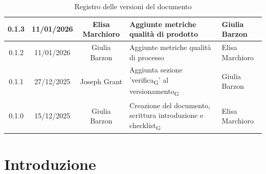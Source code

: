 \documentclass[11pt,a4paper]{article}
\newcommand{\gls}[1]{#1\textsubscript{G}}
\begin{document}
\begin{table}[H]
\begin{tabular}{|c|c|c|>{\raggedright\arraybackslash}p{}|p{}|}
        \hline
        0.1.3 & 11/01/2026 & Elisa Marchioro & Aggiunte metriche qualità di prodotto & Giulia Barzon \\
        \hline
        0.1.2 & 11/01/2026 & Giulia Barzon & Aggiunte metriche qualità di processo & Elisa Marchioro\\
        \hline
        0.1.1 & 27/12/2025 & Joseph Grant & Aggiunta sezione '\gls{verifica}' al \gls{versionamento} & Giulia Barzon\\
        \hline
        0.1.0 & 15/12/2025 & Giulia Barzon & Creazione del documento, scrittura introduzione e \gls{checklist} & Elisa Marchioro\\
        \hline
    \end{tabular}
    \caption{Registro delle versioni del documento}
    \label{tab:versionamento}
\end{table}

\newpage

\tableofcontents
\thispagestyle{empty}
\newpage

\setcounter{page}{1}

\newcommand{\prossimoUT}{UT-\arabic{codiceUT}\stepcounter{codiceUT}}

\newcommand{\prossimoCT}{CT-\arabic{codiceCT}\stepcounter{codiceCT}}

\newcommand{\prossimoIT}{IT-\arabic{codiceIT}\stepcounter{codiceIT}}

\section{Introduzione}
\end{document}
